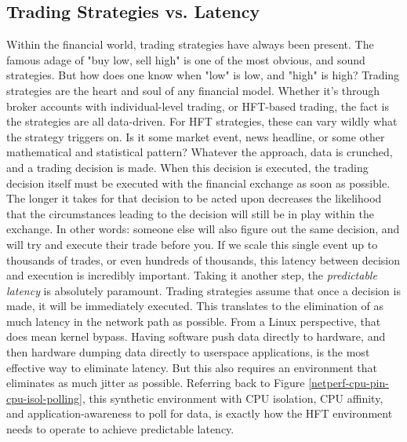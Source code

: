 \documentclass[letterpaper]{article}
\begin{document}
{{\subsection{Trading Strategies vs. Latency}
Within the financial world, trading strategies have always been present.  The famous adage of "buy low, sell high" is one of the most obvious, and sound strategies.  But how does one know when "low" is low, and "high" is high?
\newline
\newline
Trading strategies are the heart and soul of any financial model. Whether it's through broker accounts with individual-level trading, or HFT-based trading, the fact is the strategies are all data-driven.  For HFT strategies, these can vary wildly what the strategy triggers on.  Is it some market event, news headline, or some other mathematical and statistical pattern?  Whatever the approach, data is crunched, and a trading decision is made. When this decision is executed, the trading decision itself must be executed with the financial exchange as soon as possible.  The longer it takes for that decision to be acted upon decreases the likelihood that the circumstances leading to the decision will still be in play within the exchange.  In other words: someone else will also figure out the same decision, and will try and execute their trade before you.  If we scale this single event up to thousands of trades, or even hundreds of thousands, this latency between decision and execution is incredibly important. Taking it another step, the {\it predictable latency} is absolutely paramount.
\newline
\newline
Trading strategies assume that once a decision is made, it will be immediately executed. This translates to the elimination of as much latency in the network path as possible. From a Linux perspective, that does mean kernel bypass.  Having software push data directly to hardware, and then hardware dumping data directly to userspace applications, is the most effective way to eliminate latency.  But this also requires an environment that eliminates as much jitter as possible. Referring back to Figure \ref{netperf-cpu-pin-cpu-isol-polling}, this synthetic environment with CPU isolation, CPU affinity, and application-awareness to poll for data, is exactly how the HFT environment needs to operate to achieve predictable latency.

}}
\end{document}
